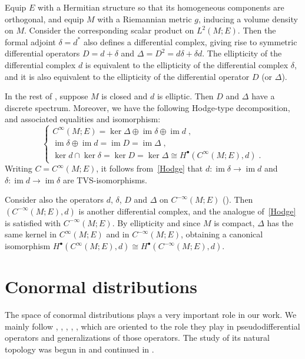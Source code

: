 \documentclass{memo-l}
\theoremstyle{plain}
\theoremstyle{definition}
\theoremstyle{remark}
\newcommand{\im}{\operatorname{im}}
\numberwithin{section}{chapter}
\numberwithin{equation}{section}%
\begin{document}
Equip $E$ with a Hermitian structure so that its homogeneous components are orthogonal, and equip $M$ with a Riemannian metric $g$, inducing a volume density on $M$. Consider the corresponding scalar product on $L^2(M;E)$. Then the formal adjoint $\delta=d^*$ also defines a differential complex, giving rise to symmetric differential operators $D=d+\delta$ and $\Delta=D^2=d\delta+\delta d$. The ellipticity of the differential complex $d$ is equivalent to the ellipticity of the differential complex $\delta$, and it is also equivalent to the ellipticity of the differential operator $D$ (or $\Delta$).

In the rest of , suppose $M$ is closed and $d$ is elliptic. Then $D$ and $\Delta$ have a discrete spectrum. Moreover, we have the following Hodge-type decomposition, and associated equalities and isomorphism:
\begin{equation}\label{Hodge}
\left\{
\begin{array}{c}
C^\infty(M;E)=\ker\Delta\oplus\im\delta\oplus\im d\;,\\[4pt]
\im\delta\oplus\im d=\im D=\im\Delta\;,\\[4pt]
\ker d\cap\ker\delta=\ker D=\ker\Delta\cong H^\bullet(C^\infty(M;E),d)\;.
\end{array}
\right.
\end{equation}
Writing $C=C^\infty(M;E)$, it follows from~\eqref{Hodge} that $d:\im\delta\to\im d$ and $\delta:\im d\to\im\delta$ are TVS-isomorphisms.

Consider also the operators $d$, $\delta$, $D$ and $\Delta$ on $C^{-\infty}(M;E)$ (). Then $(C^{-\infty}(M;E),d)$ is another differential complex, and the analogue of~\eqref{Hodge} is satisfied with $C^{-\infty}(M;E)$. By ellipticity and since $M$ is compact, $\Delta$ has the same kernel in $C^\infty(M;E)$ and in $C^{-\infty}(M;E)$, obtaining a canonical isomorphism $H^\bullet(C^\infty(M;E),d)\cong H^\bullet(C^{-\infty}(M;E),d)$.



\section{Conormal distributions}\label{s: conormal distribs}

The space of conormal distributions plays a very important role in our work. We mainly follow  \cite{KohnNirenberg1965,Hormander1971}, \cite[Section~18.2]{Hormander1985-III}, \cite[Chapters~3--5]{Simanca1990}, \cite[Chapters~4 and~6]{Melrose1996}, \cite[Chapters~3 and~9]{MelroseUhlmann2008}, which are oriented to the role they play in pseudodifferential operators and generalizations of those operators. The study of its natural topology was begun in \cite[Chapters~4 and~6]{Melrose1996} and continued in \cite{AlvKordyLeichtnam-conormal}.
\end{document}
